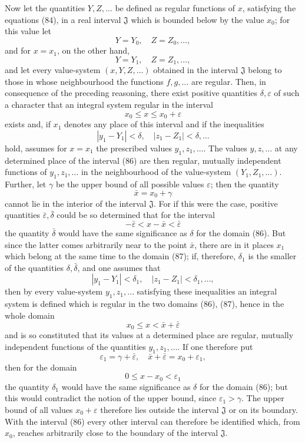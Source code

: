 \documentclass[11pt,a4paper,leqno]{article}
\begin{document}
Now let the quantities $Y,Z,\ldots$ be defined as regular functions of $x$, satisfying the equations (84), in a real interval $\mathfrak J$ which is bounded below by the value $x_0$; for this value let
\[
Y=Y_0,\quad Z=Z_0,\ldots,
\]
and for $x=x_1$, on the other hand,
\[
Y=Y_1,\quad Z=Z_1,\ldots,
\]
and let every value-system $(x,Y,Z,\ldots)$ obtained in the interval $\mathfrak J$ belong to those in whose neighbourhood the functions $f,g,\ldots$
are regular. Then, in consequence of the preceding reasoning, there exist positive quantities $\delta,\varepsilon$ of such a character that an integral system regular in the interval
\begin{equation}\tag{86}
x_0\leq x\leq x_0+\varepsilon
\end{equation}
exists and, if $x_1$ denotes any place of this interval and if the inequalities
\[
|y_1-Y_1|<\delta,\quad |z_1-Z_1|<\delta,\ldots
\]
hold, assumes for $x=x_1$ the prescribed values $y_1,z_1,\ldots$. The values $y,z,\ldots$ at any determined place of the interval (86) are then regular, mutually independent functions of $y_1,z_1,\ldots$ in the neighbourhood of the value-system $(Y_1,Z_1,\ldots)$. Further, let $\gamma$ be the upper bound of all possible values $\varepsilon$; then the quantity
\[
\bar x=x_0+\gamma
\]
cannot lie in the interior of the interval $\mathfrak J$. For if this were the case, positive quantities $\bar\varepsilon,\bar\delta$ could be so determined that for the interval
\begin{equation}\tag{87}
-\bar\varepsilon<x-\bar x<\bar\varepsilon
\end{equation}
the quantity $\bar\delta$ would have the same significance as $\delta$ for the domain (86). But since the latter comes arbitrarily near to the point $\bar x$, there are in it places $x_1$ which belong at the same time to the domain (87); if, therefore, $\delta_1$ is the smaller of the quantities $\delta,\bar\delta$, and one assumes that
\[
|y_1-Y_1|<\delta_1,\quad |z_1-Z_1|<\delta_1,\ldots,
\]
then by every value-system $y_1,z_1,\ldots$ satisfying these inequalities an integral system is defined which is regular in the two domains (86), (87), hence in the whole domain
\[
x_0\leq x<\bar x+\bar\varepsilon
\]
and is so constituted that its values at a determined place are regular, mutually independent functions of the quantities $y_1,z_1,\ldots$. If one therefore put
\[
\varepsilon_1=\gamma+\bar\varepsilon,\quad \bar x+\bar\varepsilon=x_0+\varepsilon_1,
\]
then for the domain
\[
0\leq x-x_0<\varepsilon_1
\]
the quantity $\delta_1$ would have the same significance as $\delta$ for the domain (86); but this would contradict the notion of the upper bound, since $\varepsilon_1>\gamma$. The upper bound of all values $x_0+\varepsilon$ therefore lies outside the
interval $\mathfrak J$ or on its boundary. With the interval (86) every other interval can therefore be identified which, from $x_0$, reaches arbitrarily close to the boundary of the interval $\mathfrak J$.
\end{document}
